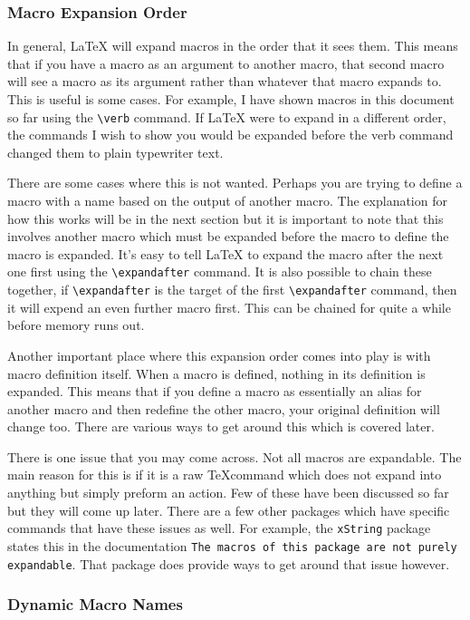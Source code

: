 \subsubsection{Macro Expansion Order}
In general, \LaTeX{} will expand macros in the order that it sees them. This means that if you have a macro as an argument to another macro, that second macro will see a macro as its argument rather than whatever that macro expands to. This is useful is some cases. For example, I have shown macros in this document so far using the \verb=\verb= command. If \LaTeX{} were to expand in a different order, the commands I wish to show you would be expanded before the verb command changed them to plain typewriter text. \par
There are some cases where this is not wanted. Perhaps you are trying to define a macro with a name based on the output of another macro. The explanation for how this works will be in the next section but it is important to note that this involves another macro which must be expanded before the macro to define the macro is expanded. It's easy to tell \LaTeX{} to expand the macro after the next one first using the \verb=\expandafter= command. It is also possible to chain these together, if \verb=\expandafter= is the target of the first \verb=\expandafter= command, then it will expend an even further macro first. This can be chained for quite a while before memory runs out. \par
Another important place where this expansion order comes into play is with macro definition itself. When a macro is defined, nothing in its definition is expanded. This means that if you define a macro as essentially an alias for another macro and then redefine the other macro, your original definition will change too. There are various ways to get around this which is covered later. \par
There is one issue that you may come across. Not all macros are expandable. The main reason for this is if it is a raw \TeX command which does not expand into anything but simply preform an action. Few of these have been discussed so far but they will come up later. There are a few other packages which have specific commands that have these issues as well. For example, the \texttt{xString} package states this in the documentation \texttt{The macros of this package are not purely expandable}. That package does provide ways to get around that issue however.
\subsubsection{Dynamic Macro Names}
